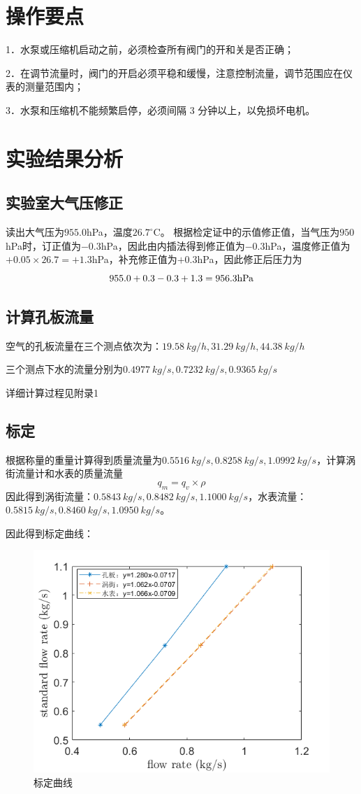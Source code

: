 \documentclass[UTF8]{article}
\begin{document}
	\section{操作要点}
	1．水泵或压缩机启动之前，必须检查所有阀门的开和关是否正确；
	
	2．在调节流量时，阀门的开启必须平稳和缓慢，注意控制流量，调节范围应在仪
	表的测量范围内；
	
	3．水泵和压缩机不能频繁启停，必须间隔 3 分钟以上，以免损坏电机。

	
	
	\section{实验结果分析}
	\subsection{实验室大气压修正}
	
	读出大气压为$955.0$hPa，温度$26.7^\circ $C。
	根据检定证中的示值修正值，当气压为$950$hPa时，订正值为$-0.3$hPa，因此由内插法得到修正值为$-0.3$hPa，温度修正值为$+0.05\times 26.7 = +1.3$hPa，补充修正值为$+0.3$hPa，因此修正后压力为
	\[
	955.0+0.3-0.3+1.3 = 956.3\rm hPa
	\]
	
	\subsection{计算孔板流量}
	空气的孔板流量在三个测点依次为：$19.58\ kg/h, 31.29\ kg/h, 44.38\ kg/h$
	
	三个测点下水的流量分别为$0.4977\ kg/s, 0.7232\ kg/s, 0.9365\ kg/s$
	
	详细计算过程见附录1
	
	\subsection{标定}
	
	根据称量的重量计算得到质量流量为$0.5516\ kg/s,0.8258\ kg/s, 1.0992\ kg/s$，计算涡街流量计和水表的质量流量
	\[
	q_m = q_v\times \rho
	\]
	因此得到涡街流量：$0.5843\ kg/s,0.8482\ kg/s,1.1000\ kg/s$，水表流量：$0.5815\ kg/s,0.8460\ kg/s, 1.0950\ kg/s$。
	
	因此得到标定曲线：
	\begin{figure}[H]
		\centering
		\includegraphics[width=0.6\linewidth]{figure/figure}
		\caption{标定曲线}
		\label{fig:figure}
	\end{figure}
\end{document}

